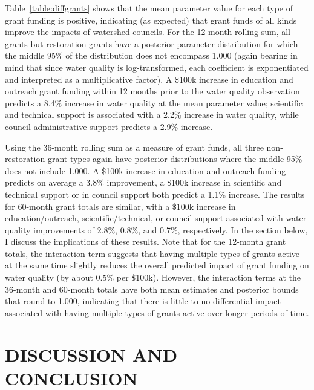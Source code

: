 \documentclass[12pt,a4paper,titlepage]{article}
\begin{document}
Table~\ref{table:diffgrants} shows that the mean parameter value for each type of grant funding is positive, indicating (as expected) that grant funds of all kinds improve the impacts of watershed councils. For the 12-month rolling sum, all grants but restoration grants have a posterior parameter distribution for which the middle 95\% of the distribution does not encompass 1.000 (again bearing in mind that since water quality is log-transformed, each coefficient is exponentiated and interpreted as a multiplicative factor). A \$100k increase in education and outreach grant funding within 12 months prior to the water quality observation predicts a 8.4\% increase in water quality at the mean parameter value; scientific and technical support is associated with a 2.2\% increase in water quality, while council administrative support predicts a 2.9\% increase.



Using the 36-month rolling sum as a measure of grant funds, all three non-restoration grant types again have posterior distributions where the middle 95\% does not include 1.000. A \$100k increase in education and outreach funding predicts on average a 3.8\% improvement, a \$100k increase in scientific and technical support or in council support both predict a 1.1\% increase. The results for 60-month grant totals are similar, with a \$100k increase in education/outreach, scientific/technical, or council support associated with water quality improvements of 2.8\%, 0.8\%, and 0.7\%, respectively. In the section below, I discuss the implications of these results. Note that for the 12-month grant totals, the interaction term suggests that having multiple types of grants active at the same time slightly reduces the overall predicted impact of grant funding on water quality (by about 0.5\% per \$100k). However, the interaction terms at the 36-month and 60-month totals have both mean estimates and posterior bounds that round to 1.000, indicating that there is little-to-no differential impact associated with having multiple types of grants active over longer periods of time.

\section*{\bf\MakeUppercase{Discussion and Conclusion}}
\end{document}

